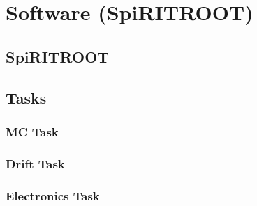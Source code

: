 \chapter{Software (SpiRITROOT)}
\section{SpiRITROOT}
\section{Tasks}
\subsection{MC Task}
\subsection{Drift Task}
\subsection{Electronics Task}
